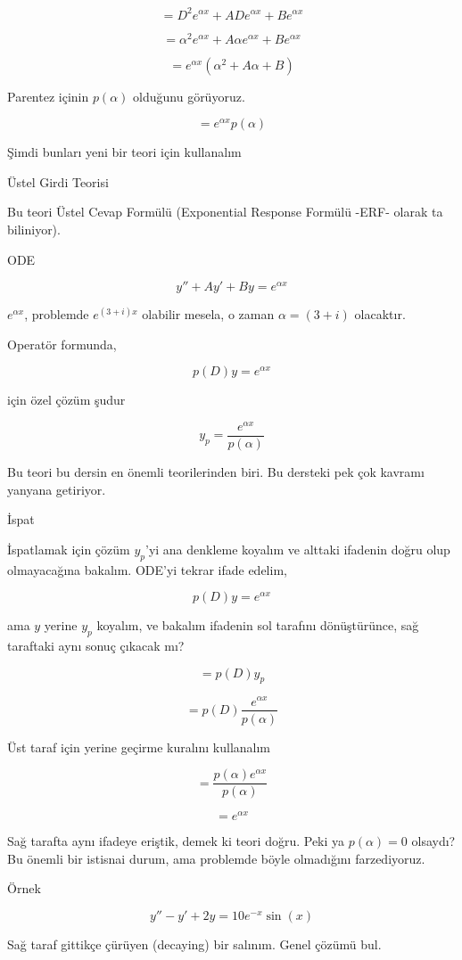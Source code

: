 \documentclass[12pt,fleqn]{article}\usepackage{../../common}
\begin{document}
$$ = D^2e^{\alpha x} + ADe^{\alpha x} + Be^{\alpha x} $$

$$ = \alpha^2 e^{\alpha x} + A \alpha e^{\alpha x} + Be^{\alpha x} $$

$$ = e^{\alpha x}(\alpha^2  + A \alpha + B)$$

Parentez içinin $p(\alpha)$ olduğunu görüyoruz. 

$$ = e^{\alpha x}p(\alpha)$$

Şimdi bunları yeni bir teori için kullanalım

Üstel Girdi Teorisi 

Bu teori Üstel Cevap Formülü (Exponential Response Formülü -ERF- olarak ta
biliniyor).

ODE

$$ y'' + Ay' + By = e^{\alpha x} $$

$e^{\alpha x}$, problemde $e^{(3+i)x}$ olabilir mesela, o zaman $\alpha
= (3+i)$ olacaktır. 

Operatör formunda,

$$ p(D)y = e^{\alpha x} $$

için özel çözüm şudur

$$ y_p = \frac{e^{\alpha x}}{p(\alpha)} $$

Bu teori bu dersin en önemli teorilerinden biri. Bu dersteki pek çok
kavramı yanyana getiriyor. 

İspat

İspatlamak için çözüm $y_p$'yi ana denkleme koyalım ve alttaki ifadenin doğru
olup olmayacağına bakalım. ODE'yi tekrar ifade edelim, 

$$ p(D)y =  e^{\alpha x} $$

ama $y$ yerine $y_p$ koyalım, ve bakalım ifadenin sol tarafını
dönüştürünce, sağ taraftaki aynı sonuç çıkacak mı?

$$ = p(D)y_p$$

$$ = p(D)\frac{e^{\alpha x}}{p(\alpha)}  $$

Üst taraf için yerine geçirme kuralını kullanalım

$$ = \frac{p(\alpha)e^{\alpha x}}{p(\alpha)} $$

$$ = e^{\alpha x} $$

Sağ tarafta aynı ifadeye eriştik, demek ki teori doğru. Peki ya $p(\alpha)
= 0$ olsaydı? Bu önemli bir istisnai durum, ama problemde böyle olmadığını
 farzediyoruz.

Örnek 

$$ y'' - y' + 2y = 10e^{-x}\sin(x) $$

Sağ taraf gittikçe çürüyen (decaying) bir salınım. Genel çözümü bul.
\end{document}
